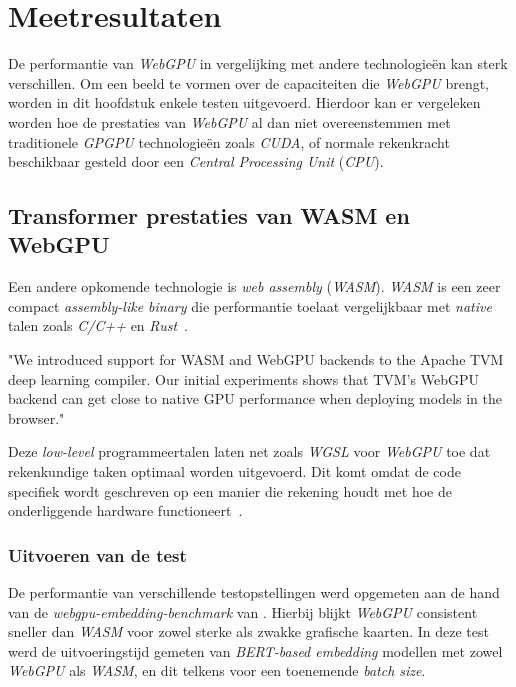\chapter{Meetresultaten}%
\label{ch:benchmarks}

De performantie van \textit{WebGPU} in vergelijking met andere technologieën kan sterk verschillen. Om een beeld te vormen over de capaciteiten die \textit{WebGPU} brengt, worden in dit hoofdstuk enkele testen uitgevoerd. Hierdoor kan er vergeleken worden hoe de prestaties van \textit{WebGPU} al dan niet overeenstemmen met traditionele \textit{GPGPU} technologieën zoals \textit{CUDA}, of normale rekenkracht beschikbaar gesteld door een \textit{Central Processing Unit} (\textit{CPU}).

\section{Transformer prestaties van WASM en WebGPU}

Een andere opkomende technologie is \textit{web assembly} (\textit{WASM}). \textit{WASM} is een zeer compact \textit{assembly-like binary} die performantie toelaat vergelijkbaar met \textit{native} talen zoals \textit{C/C++} en \textit{Rust}~\autocite{Steiner2023}.

\begin{displayquote}
    "We introduced support for WASM and WebGPU backends to the Apache TVM deep learning compiler. Our initial experiments shows that TVM's WebGPU backend can get close to native GPU performance when deploying models in the browser."
\end{displayquote}

Deze \textit{low-level} programmeertalen laten net zoals \textit{WGSL} voor \textit{WebGPU} toe dat rekenkundige taken optimaal worden uitgevoerd. Dit komt omdat de code specifiek wordt geschreven op een manier die rekening houdt met hoe de onderliggende hardware functioneert~\autocite{Knight2020}.

\begin{figure}
    \centering
    
    \label{sec:transformerbench}
\end{figure}

\subsection{Uitvoeren van de test}

De performantie van verschillende testopstellingen werd opgemeten aan de hand van de \textit{webgpu-embedding-benchmark} van \textcite{Lochner2024}. Hierbij blijkt \textit{WebGPU} consistent sneller dan \textit{WASM} voor zowel sterke als zwakke grafische kaarten. In deze test werd de uitvoeringstijd gemeten van \textit{BERT-based embedding} modellen met zowel \textit{WebGPU} als \textit{WASM}, en dit telkens voor een toenemende \textit{batch size}.

